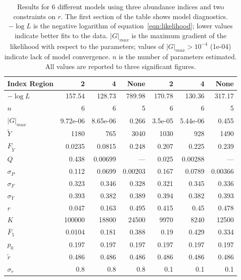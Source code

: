 \documentclass[12pt,letterpaper]{article}
\newcommand\MSY{\widetilde{Y}}
\newcommand\Fmsy{F_{\MSY}}
\begin{document}
\begin{table}
{\small
\caption{Results for 6 different models using three
abundance indices and two constraints on $r$. The first section of the
table shows model diagnostics. $-\log L$ is the negative logarithm of
equation~\ref{eqn:likelihood}; lower values indicate better fits to
the data.
$|G|_{max}$ is the maximum gradient of the likelihood with respect to
the parameters; values of $|G|_{max}>10^{-4}$ (1e-04) indicate lack of
model convergence.
$n$ is the number of parameters estimated.
All values are reported to three significant figures.
}
\label{tab:ests1}
\begin{center}
\begin{tabular}{|l|rrr|rrr|}
\hline
Index Region  &  2& 4& None& 2& 4& None\\
\hline
$-\log L$ & 157.54 & 128.73 & 789.98 & 170.78 & 130.36 & 317.17\\
$n$ & 6 & 6 & 5 & 6 & 6 & 5\\
$|G|_{max}$ & 9.72e-06 & 8.65e-06 & 0.266 & 3.5e-05 & 5.44e-06 & 0.455\\
\hline
$\MSY$ & 1180 & 765 & 3040 & 1030 & 928 & 1490\\
$\Fmsy$ & 0.0235 & 0.0815 & 0.248 & 0.207 & 0.225 & 0.239\\
$Q$ & 0.438 & 0.00699 & --- & 0.025 & 0.00288 & ---\\
$\sigma_P$ & 0.112 & 0.0699 & 0.00203 & 0.167 & 0.0789 & 0.00366\\
$\sigma_F$ & 0.323 & 0.346 & 0.328 & 0.321 & 0.345 & 0.336\\
$\sigma_Y$ & 0.393 & 0.382 & 0.389 & 0.394 & 0.382 & 0.393\\
\hline
$r$ & 0.047 & 0.163 & 0.495 & 0.415 & 0.45 & 0.478\\
$K$ & 100000 & 18800 & 24500 & 9970 & 8240 & 12500\\
$\bar{F}_5$ & 0.0104 & 0.181 & 0.388 & 0.19 & 0.429 & 0.334\\
\hline
$p_0$ & 0.197 & 0.197 & 0.197 & 0.197 & 0.197 & 0.197\\
$\tilde{r}$ & 0.486 & 0.486 & 0.486 & 0.486 & 0.486 & 0.486\\
$\sigma_r$ & 0.8 & 0.8 & 0.8 & 0.1 & 0.1 & 0.1\\
\hline
\end{tabular}
\end{center}
}
\end{table}
\end{document}
